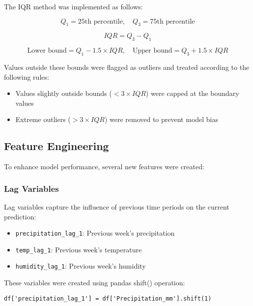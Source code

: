 \documentclass[12pt]{article}
\begin{document}
The IQR method was implemented as follows:

\begin{equation}
Q_1 = \text{25th percentile}, \quad Q_3 = \text{75th percentile}
\end{equation}

\begin{equation}
IQR = Q_3 - Q_1
\end{equation}

\begin{equation}
\text{Lower bound} = Q_1 - 1.5 \times IQR, \quad \text{Upper bound} = Q_3 + 1.5 \times IQR
\end{equation}

Values outside these bounds were flagged as outliers and treated according to the following rules:
\begin{itemize}
    \item Values slightly outside bounds ($< 3 \times IQR$) were capped at the boundary values
    \item Extreme outliers ($> 3 \times IQR$) were removed to prevent model bias
\end{itemize}

\subsection{Feature Engineering}
\label{subsec:feature_engineering}

To enhance model performance, several new features were created:

\subsubsection{Lag Variables}
\label{subsubsec:lag_variables}

Lag variables capture the influence of previous time periods on the current prediction:
\begin{itemize}
    \item \texttt{precipitation\_lag\_1}: Previous week's precipitation
    \item \texttt{temp\_lag\_1}: Previous week's temperature
    \item \texttt{humidity\_lag\_1}: Previous week's humidity
\end{itemize}

These variables were created using pandas shift() operation:
\begin{verbatim}
df['precipitation_lag_1'] = df['Precipitation_mm'].shift(1)
\end{verbatim}
\end{document}

